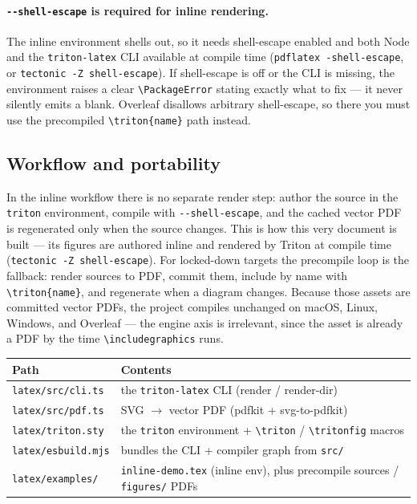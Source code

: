 \paragraph{\texttt{-{}-shell-escape} is required for inline rendering.}
The inline environment shells out, so it needs shell-escape enabled and both
Node and the \texttt{triton-latex} CLI available at compile time
(\texttt{pdflatex -shell-escape}, or \texttt{tectonic -Z shell-escape}). If
shell-escape is off or the CLI is missing, the environment raises a clear
\texttt{\textbackslash PackageError} stating exactly what to fix --- it never silently emits a
blank. Overleaf disallows arbitrary shell-escape, so there you must use the
precompiled \texttt{\textbackslash triton\{name\}} path instead.

\subsection{Workflow and portability}

In the inline workflow there is no separate render step: author the source in the
\texttt{triton} environment, compile with \texttt{-{}-shell-escape}, and the
cached vector PDF is regenerated only when the source changes. This is how this
very document is built --- its figures are authored inline and rendered by Triton
at compile time (\texttt{tectonic -Z shell-escape}). For locked-down targets the
precompile loop is the fallback: render sources to PDF, commit them,
include by name with \texttt{\textbackslash triton\{name\}}, and regenerate when a diagram
changes. Because those assets are committed vector PDFs, the project compiles
unchanged on macOS, Linux, Windows, and Overleaf --- the engine axis is
irrelevant, since the asset is already a PDF by the time
\texttt{\textbackslash includegraphics} runs.

\begin{center}
\begin{tabular}{ll}
\toprule
Path & Contents \\
\midrule
\texttt{latex/src/cli.ts}   & the \texttt{triton-latex} CLI (render / render-dir) \\
\texttt{latex/src/pdf.ts}   & SVG $\rightarrow$ vector PDF (pdfkit + svg-to-pdfkit) \\
\texttt{latex/triton.sty}   & the \texttt{triton} environment + \texttt{\textbackslash triton} / \texttt{\textbackslash tritonfig} macros \\
\texttt{latex/esbuild.mjs}  & bundles the CLI + compiler graph from \texttt{src/} \\
\texttt{latex/examples/}    & \texttt{inline-demo.tex} (inline env), plus precompile sources / \texttt{figures/} PDFs \\
\bottomrule
\end{tabular}
\end{center}
